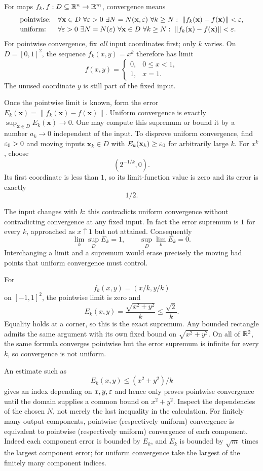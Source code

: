 For maps $f_k,f:D\subseteq\mathbb{R}^n\to\mathbb{R}^m$, convergence means
\[
\begin{array}{ll}
\text{pointwise:}&\forall \mathbf{x}\in D\ \forall\varepsilon>0\ \exists N=N(\mathbf{x},\varepsilon)
\ \forall k\geq N:\ \|f_k(\mathbf{x})-f(\mathbf{x})\|<\varepsilon,\\[2pt]
\text{uniform:}&\forall\varepsilon>0\ \exists N=N(\varepsilon)\ \forall \mathbf{x}\in D
\ \forall k\geq N:\ \|f_k(\mathbf{x})-f(\mathbf{x})\|<\varepsilon.
\end{array}
\]
For pointwise convergence, fix \emph{all} input coordinates first; only
$k$ varies. On $D=[0,1]^2$, the sequence $f_k(x,y)=x^k$ therefore has limit
\[
f(x,y)=\begin{cases}0,&0\leq x<1,\\1,&x=1.\end{cases}
\]
The unused coordinate $y$ is still part of the fixed input.

Once the pointwise limit is known, form the error
$E_k(\mathbf{x})=\|f_k(\mathbf{x})-f(\mathbf{x})\|$. Uniform convergence is exactly
$\sup_{\mathbf{x}\in D}E_k(\mathbf{x})\to0$. One may compute this supremum or bound it
by a number $a_k\to0$ independent of the input. To disprove uniform
convergence, find $\varepsilon_0>0$ and moving inputs $\mathbf{x}_k\in D$ with
$E_k(\mathbf{x}_k)\geq\varepsilon_0$ for arbitrarily large $k$.
For $x^k$, choose
\[
(2^{-1/k},0).
\]
 Its first coordinate is less than $1$,
so its limit-function value is zero and its error is exactly
\[
1/2.
\]

The input changes with $k$: this contradicts uniform convergence without
contradicting convergence at any fixed input. In fact the error supremum
is $1$ for every $k$, approached as $x\uparrow1$ but not attained.
Consequently
\[
\lim_k\sup_D E_k=1,\qquad \sup_D\lim_k E_k=0.
\]
Interchanging a limit and a supremum would erase precisely the moving
bad points that uniform convergence must control.

\begin{example}
For
\[
f_k(x,y)=(x/k,y/k)
\]
 on $[-1,1]^2$, the pointwise limit is zero and
\[
E_k(x,y)=\frac{\sqrt{x^2+y^2}}{k}\leq\frac{\sqrt2}{k}.
\]
Equality holds at a corner, so this is the exact supremum. Any bounded
rectangle admits the same argument with its own fixed bound on
$\sqrt{x^2+y^2}$. On all of $\mathbb{R}^2$, the same formula converges pointwise
but the error supremum is infinite for every $k$, so convergence is not uniform.
\end{example}
An estimate such as
\[
E_k(x,y)\leq(x^2+y^2)/k
\]
 gives an index depending
on $x,y,\varepsilon$ and hence only proves pointwise convergence until the
domain supplies a common bound on $x^2+y^2$. Inspect the dependencies
of the chosen $N$, not merely the last inequality in the calculation.
For finitely many output components, pointwise (respectively uniform)
convergence is equivalent to pointwise (respectively uniform) convergence
of each component. Indeed each component error is bounded by $E_k$,
and $E_k$ is bounded by $\sqrt m$ times the largest component error;
for uniform convergence take the largest of the finitely many component indices.

